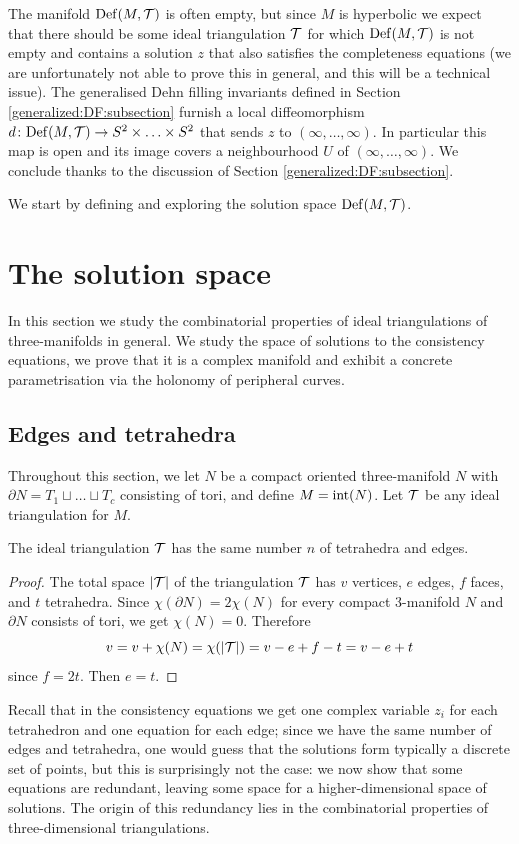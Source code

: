 The manifold ${\rm Def}(M,\mathcal{T})$ is often empty, but since $M$ is hyperbolic we expect that there should be some ideal triangulation $\mathcal{T}$ for which ${\rm Def}(M,\mathcal{T})$ is not empty and contains a solution $z$ that also satisfies the completeness equations (we are unfortunately not able to prove this in general, and this will be a technical issue). The generalised Dehn filling invariants defined in Section \ref{generalized:DF:subsection} furnish a local diffeomorphism $d\colon {\rm Def}(M,\mathcal{T}) \to S^2 \times \ldots \times S^2$ that sends $z$ to $(\infty,\ldots,\infty)$. In particular this map is open and its image covers a neighbourhood $U$ of $(\infty,\ldots, \infty)$. We conclude thanks to the discussion of Section \ref{generalized:DF:subsection}. 

We start by defining and exploring the solution space ${\rm Def}(M,\mathcal{T})$.

\section{The solution space} \label{solution:space:section}
In this section we study the combinatorial properties of ideal triangulations of three-manifolds in general. We study the space of solutions to the consistency equations, we prove that it is a complex manifold and exhibit a concrete parametrisation via the holonomy of peripheral curves.

\subsection{Edges and tetrahedra}
Throughout this section, we let $N$ be a compact oriented three-manifold $N$ with $\partial N = T_1 \sqcup \ldots \sqcup T_c$ consisting of tori, and define $M={\rm int}(N)$. Let $\mathcal{T}$ be any ideal triangulation for $M$. 

\begin{prop} \label{edges:prop}
The ideal triangulation $\mathcal{T}$ has the same number $n$ of tetrahedra and edges.
\end{prop}
\begin{proof}
The total space $|\mathcal{T}|$ of the triangulation $\mathcal{T}$ has $v$ vertices, $e$ edges, $f$ faces, and $t$ tetrahedra. Since $\chi(\partial N) = 2\chi(N)$ for every compact 3-manifold $N$ and $\partial N$ consists of tori, we get $\chi(N)=0$. Therefore
$$v = v + \chi(N) = \chi(|\mathcal{T}|) = v-e+f-t = v-e+t$$
since $f = 2t$. Then $e=t$.
\end{proof}

Recall that in the consistency equations we get one complex variable $z_i$ for each tetrahedron and one equation for each edge; since we have the same number of edges and tetrahedra, one would guess that the solutions form typically a discrete set of points, but this is surprisingly not the case: we now show that some equations are redundant, leaving some space for a higher-dimensional space of solutions. The origin of this redundancy lies in the combinatorial properties of three-dimensional triangulations.

